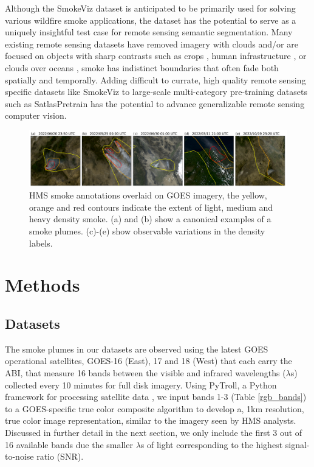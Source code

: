 \documentclass{article}
\begin{document}
Although the SmokeViz dataset is anticipated to be primarily used for solving various wildfire smoke applications, the dataset has the potential to serve as a uniquely insightful test case for remote sensing semantic segmentation. Many existing remote sensing datasets have removed imagery with clouds \cite{bigearthnet, crops} and/or are focused on objects with sharp contrasts such as crops \cite{crops}, human infrastructure \cite{polyworld}, or clouds over oceans \cite{cyclone, cloud_texture}, smoke has indistinct boundaries that often fade both spatially and temporally. Adding difficult to currate, high quality remote sensing specific datasets like SmokeViz to large-scale multi-category pre-training datasets such as SatlasPretrain \cite{satlas} has the potential to advance generalizable remote sensing computer vision.

\begin{figure}[!htb]
    \centering
    \includegraphics[width=\linewidth]{figures/variations2.png}
    \caption{HMS smoke annotations overlaid on GOES imagery, the yellow, orange and red contours indicate the extent of light, medium and heavy density smoke. (a) and (b) show a canonical examples of a smoke plumes. (c)-(e) show observable variations in the density labels.}\label{densities}
\end{figure}

\section{Methods}
\subsection{Datasets}

The smoke plumes in our datasets are observed using the latest GOES operational satellites, GOES-16 (East), 17 and 18 (West) that each carry the ABI, that measure 16 bands between the visible and infrared wavelengths (\(\lambda\)s) collected every 10 minutes for full disk imagery. Using PyTroll, a Python framework for processing satellite data \cite{satpy}, we input bands 1-3 (Table \ref{rgb_bands}) to a GOES-specific true color composite algorithm \cite{true_color} to develop a, 1km resolution, true color image representation, similar to the imagery seen by HMS analysts. Discussed in further detail in the next section, we only include the first 3 out of 16 available bands due the smaller \(\lambda\)s of light corresponding to the highest signal-to-noise ratio (SNR).
\end{document}
